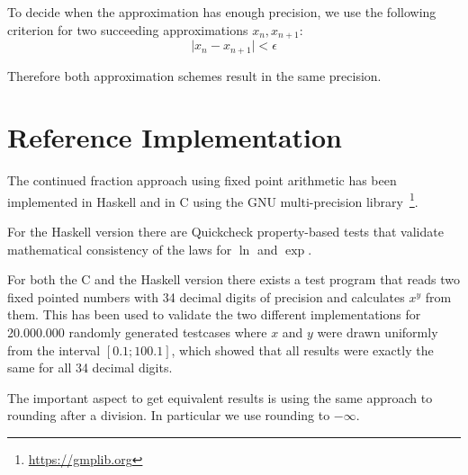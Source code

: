 \documentclass[11pt,a4paper,dvipsnames]{article}
\theoremstyle{definition}
\theoremstyle{definition}
\begin{document}
To decide when the approximation has enough precision, we use the following
criterion for two succeeding approximations $x_{n}, x_{n+1}$:
\begin{equation*}
  \vert x_{n} - x_{n+1}\vert < \epsilon
\end{equation*}

Therefore both approximation schemes result in the same precision.

\section{Reference Implementation}
\label{sec:refer-impl}

The continued fraction approach using fixed point arithmetic has been
implemented in Haskell and in C using the GNU multi-precision
library~\footnote{\url{https://gmplib.org}}.

For the Haskell version there are Quickcheck property-based tests that validate
mathematical consistency of the laws for $\ln$ and $\exp$.

For both the C and the Haskell version there exists a test program that reads
two fixed pointed numbers with 34 decimal digits of precision and calculates
$x^{y}$ from them. This has been used to validate the two different
implementations for 20.000.000 randomly generated testcases where $x$ and $y$
were drawn uniformly from the interval $[0.1; 100.1]$, which showed that all
results were exactly the same for all 34 decimal digits.

The important aspect to get equivalent results is using the same approach to
rounding after a division. In particular we use rounding to $-\infty$.



\end{document}

